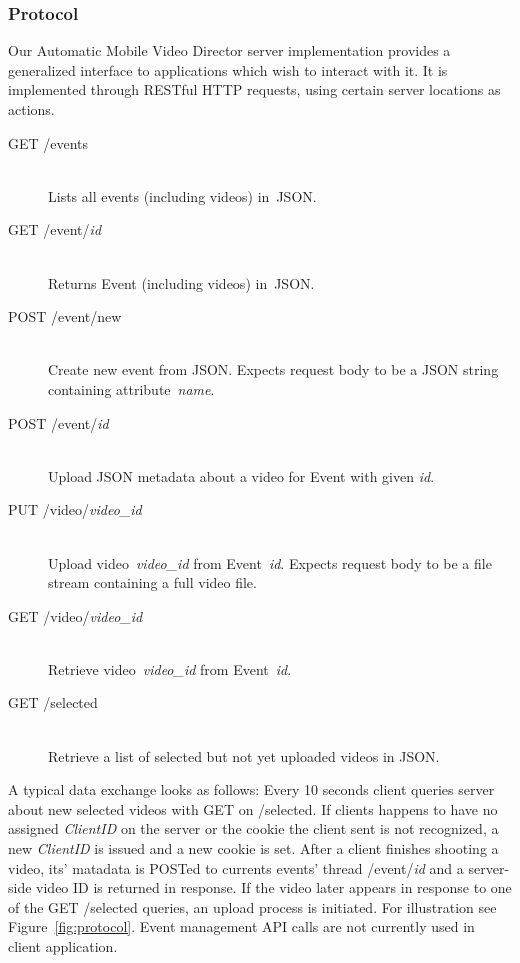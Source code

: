 \documentclass[conference]{IEEEtran}
\begin{document}
\subsubsection{Protocol}

Our Automatic Mobile Video Director server implementation provides 
a generalized interface to applications which wish to interact with it. 
It is implemented through RESTful HTTP requests, using certain server locations as actions.

\begin{description}
	\item[GET /events]\hfill\\
		Lists all events (including videos) in~JSON.
		
	\item[GET /event/\textit{id}]\hfill\\
		Returns Event (including videos) in~JSON.
				
	\item[POST /event/new]\hfill\\
		Create new event from JSON.
		Expects request body to be a JSON string containing attribute~\textit{name}.
		
	\item[POST /event/\textit{id}]\hfill\\
		Upload JSON metadata about a video for Event with given \textit{id}.
		
	\item[PUT /video/\textit{video\_id}]\hfill\\
		Upload video~\textit{video\_id} from Event~\textit{id}.
		Expects request body to be a file stream containing a full video file.
		
	\item[GET /video/\textit{video\_id}]\hfill\\
		Retrieve video~\textit{video\_id} from Event~\textit{id}.
		
	\item[GET /selected]\hfill\\
		Retrieve a list of selected but not yet uploaded videos in JSON.	
		
\end{description}

A typical data exchange looks as follows:
Every 10 seconds client queries server about new selected videos with GET on /selected.
If clients happens to have no assigned \textsl{ClientID} on the server or the cookie the client 
sent is not recognized, a new \textsl{ClientID} is issued and a new cookie is set.
After a client finishes shooting a video, its' matadata is POSTed to currents events' thread /event/\textit{id}
and a server-side video ID is returned in response.
If the video later appears in response to one of the GET /selected queries, an upload process is initiated.
For illustration see Figure~\ref{fig:protocol}.
Event management API calls are not currently used in client application.
\end{document}
